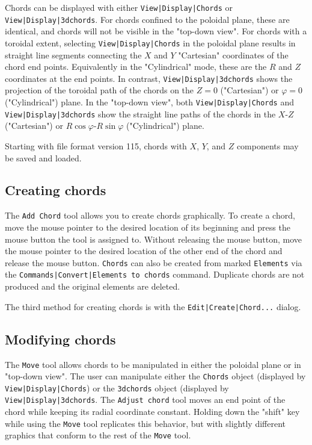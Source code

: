 \documentclass[a4paper,10pt]{report}
\begin{document}
Chords can be displayed with either
{\tt View|Display|Chords} or {\tt View|Display|3dchords}.  For chords
confined to the poloidal plane, these are identical, and chords will
not be visible in the "top-down view".  For chords with a toroidal
extent, selecting
{\tt View|Display|Chords} in the
poloidal plane results in straight
line segments connecting the
$X$ and $Y$ "Cartesian" coordinates of the chord end points.
Equivalently in the "Cylindrical" mode, these are the $R$
and $Z$ coordinates at the end points.  In contrast,
{\tt View|Display|3dchords} shows the projection
of the toroidal path of the chords on the $Z = 0$ ("Cartesian")
or $\varphi = 0$ ("Cylindrical") plane.  In the "top-down view",
both {\tt View|Display|Chords} and
{\tt View|Display|3dchords} show the straight
line paths of the chords in the $X$-$Z$ ("Cartesian") or
$R \cos \varphi$-$R \sin \varphi$ ("Cylindrical") plane.

Starting with file format version 115, chords with $X$, $Y$,
and $Z$
components may be saved and loaded.

\subsection{Creating chords}

The {\tt Add Chord} tool
allows you to create chords graphically.  To
create a chord, move the mouse pointer to the desired location of its
beginning and press the mouse button the tool is assigned to. Without
releasing the mouse button, move the mouse pointer to the desired
location of the other end of the chord and release the mouse button.
{\tt Chords} can also be created from marked {\tt Elements} via the
{\tt Commands|Convert|Elements to chords}
command.  Duplicate chords are not produced and the
original elements are deleted.

The third method for creating chords is with the
{\tt Edit|Create|Chord...} dialog.

\subsection{Modifying chords}

The {\tt Move} tool allows chords to be manipulated in either
the poloidal plane or in "top-down view".  The user can
manipulate either the {\tt Chords} object (displayed by
{\tt View|Display|Chords}) or the
{\tt 3dchords} object
(displayed by {\tt View|Display|3dchords}.
The {\tt Adjust chord} tool moves an end point of the chord
while keeping its radial coordinate constant.  Holding down the
"shift" key while using the {\tt Move}
tool replicates this behavior,
but with slightly
different graphics that conform to the rest of the {\tt Move}
tool.
\end{document}
